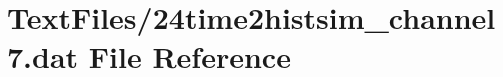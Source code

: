 \hypertarget{24time2histsim__channel7_8dat}{}\section{Text\+Files/24time2histsim\+\_\+channel7.dat File Reference}
\label{24time2histsim__channel7_8dat}
